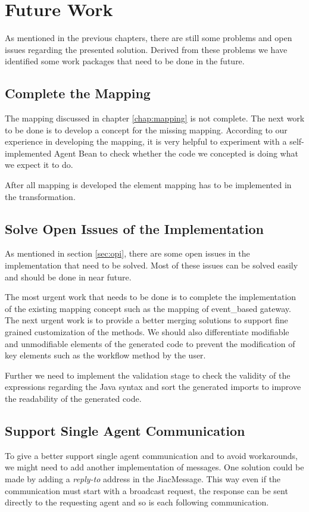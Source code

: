 \section{Future Work}
As mentioned in the previous chapters, there are still some problems and open issues regarding the presented solution. Derived from these problems we have identified some work packages that need to be done in the future.
\subsection{Complete the Mapping}
The mapping discussed in chapter \ref{chap:mapping} is not complete. The next work to be done is to develop a concept for the missing mapping. According to our experience in developing the mapping, it is very helpful to experiment with a self-implemented Agent Bean to check whether the code we concepted is doing what we expect it to do.

After all mapping is developed the element mapping has to be implemented in the transformation.

\subsection{Solve Open Issues of the Implementation}
As mentioned in section \ref{sec:opi}, there are some open issues in the implementation that need to be solved. Most of these issues can be solved easily and should be done in near future. 

The most urgent work that needs to be done is to complete the implementation of the existing mapping concept such as the mapping of event\_based gateway. 
The next urgent work is to provide a better merging solutions to support fine grained customization of the methods. We should also differentiate modifiable and unmodifiable elements of the generated code to prevent the modification of key elements such as the workflow method by the user. 

Further we need to implement the validation stage to check the validity of the expressions regarding the Java syntax and sort the generated imports to improve the readability of the generated code. 

\subsection{Support Single Agent Communication}
To give a better support single agent communication and to avoid workarounds, we might need to add another implementation of messages. One solution could be made by adding a \textit{reply-to} address in the JiacMessage. This way even if the communication must start with a broadcast request, the response can be sent directly to the requesting agent and so is each following communication. 

